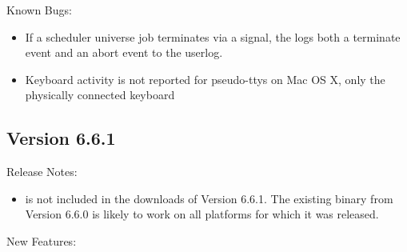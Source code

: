 \noindent Known Bugs:

\begin{itemize}

\item If a scheduler universe job terminates via a signal, the 
       logs both a terminate event and an abort event
      to the userlog. 

\item Keyboard activity is not reported for pseudo-ttys on Mac OS X, only
      the physically connected keyboard

\end{itemize}


\subsection{\label{sec:New-6-6-1}Version 6.6.1}

\noindent Release Notes:

\begin{itemize}

\item {} is not included in the downloads of Version 6.6.1.
  The existing binary from Version 6.6.0 is likely to work on all platforms
  for which it was released.

\end{itemize}


\noindent New Features:

